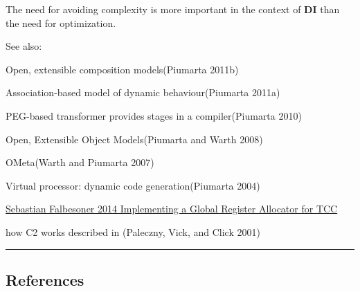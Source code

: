 The need for avoiding complexity is more important in the context of
\textbf{DI} than the need for optimization.

See also:

Open, extensible composition models(Piumarta 2011b)

Association-based model of dynamic behaviour(Piumarta 2011a)

PEG-based transformer provides stages in a compiler(Piumarta 2010)

Open, Extensible Object Models(Piumarta and Warth 2008)

OMeta(Warth and Piumarta 2007)

Virtual processor: dynamic code generation(Piumarta 2004)

\href{https://www.complang.tuwien.ac.at/Diplomarbeiten/falbesoner14.pdf}{Sebastian
Falbesoner 2014 Implementing a Global Register Allocator for TCC}

how C2 works described in (Paleczny, Vick, and Click 2001)

\begin{center}\rule{0.5\linewidth}{0.5pt}\end{center}

\hypertarget{references}{%
\subsection*{References}\label{references}}

